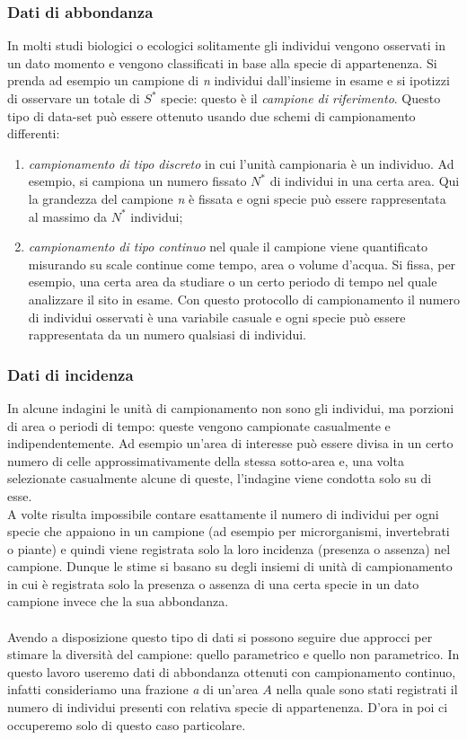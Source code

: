 \subsubsection{Dati di abbondanza}
In molti studi biologici o ecologici solitamente gli individui vengono osservati in un dato momento e vengono classificati in base alla specie di appartenenza. Si prenda ad esempio un campione di \emph{n} individui dall'insieme in esame e si ipotizzi di osservare un totale di $S^*$ specie: questo è il \emph{campione di riferimento}. Questo tipo di data-set può essere ottenuto usando due schemi di campionamento differenti:
\begin{enumerate}
    \item \emph{campionamento di tipo discreto} in cui l'unità campionaria è un individuo. Ad esempio, si campiona un numero fissato $N^*$ di individui in una certa area. Qui la grandezza del campione \emph{n} è fissata e ogni specie può essere rappresentata al massimo da $N^*$ individui;
    
    \item \emph{campionamento di tipo continuo} nel quale il campione viene quantificato misurando su scale continue come tempo, area o volume d'acqua.
    Si fissa, per esempio, una certa area da studiare o un certo periodo di tempo nel quale analizzare il sito in esame. Con questo protocollo di campionamento il numero di individui osservati è una variabile casuale e ogni specie può essere rappresentata da un numero qualsiasi di individui.
\end{enumerate}

\subsubsection{Dati di incidenza}
In alcune indagini le unità di campionamento non sono gli individui, ma porzioni di area o periodi di tempo: queste vengono campionate casualmente e indipendentemente. Ad esempio un'area di interesse può essere divisa in un certo numero di celle approssimativamente della stessa sotto-area e, una volta selezionate casualmente alcune di queste, l'indagine viene condotta solo su di esse.\\
A volte risulta impossibile contare esattamente il numero di individui per ogni specie che appaiono in un campione (ad esempio per microrganismi, invertebrati o piante) e quindi viene registrata solo la loro incidenza (presenza o assenza) nel campione. Dunque le stime si basano su degli insiemi di unità di campionamento in cui è registrata solo la presenza o assenza di una certa specie in un dato campione invece che la sua abbondanza.
\\ \\
Avendo a disposizione questo tipo di dati si possono seguire due approcci per stimare la diversità del campione: quello parametrico e quello non parametrico.
In questo lavoro useremo dati di abbondanza ottenuti con campionamento continuo, infatti consideriamo una frazione \emph{a} di un'area $A$ nella quale sono stati registrati il numero di individui presenti con relativa specie di appartenenza. D'ora in poi ci occuperemo solo di questo caso particolare.


